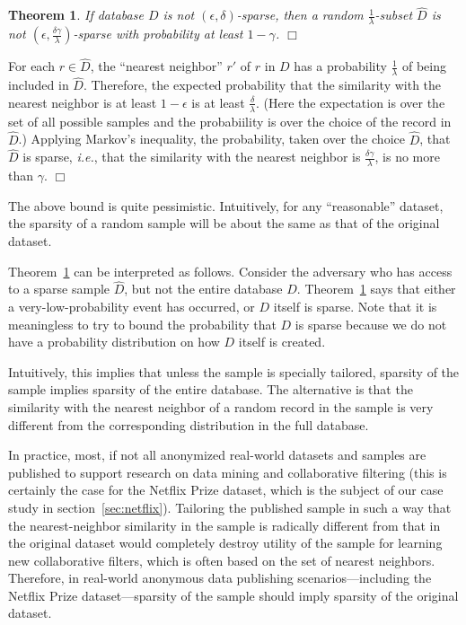 \documentclass[11pt]{article}
\newcommand{\ie}{\emph{i.e.}}
\newtheorem{theorem}{Theorem}
\newcommand{\qed}{\hfill \ensuremath{\Box}}
\begin{document}
\begin{theorem}
\label{samplesparsity}
If database $D$ is not $(\epsilon, \delta)$-sparse, then a random
$\frac{1}{\lambda}$-subset $\hat D$ is not $(\epsilon, \frac
{\delta\gamma}\lambda)$-sparse with probability at least $1-\gamma$. \qed
\end{theorem}

For each $r \in \hat D$, the ``nearest neighbor'' $r'$ of $r$ in $D$
has a probability $\frac 1 \lambda$ of being included in $\hat D$.
Therefore, the expected probability that the similarity with the nearest
neighbor is at least $1-\epsilon$ is at least $\frac \delta \lambda$.
(Here the expectation is over the set of all possible samples and the
probabiility is over the choice of the record in $\hat D$.)  Applying
Markov's inequality, the probability, taken over the choice $\hat D$, that
${\hat D}$ is sparse, \ie, that the similarity with the nearest neighbor
is $\frac{\delta\gamma}{\lambda}$, is no more than $\gamma$.  \qed

The above bound is quite pessimistic.  Intuitively, for any ``reasonable''
dataset, the sparsity of a random sample will be about the same as that
of the original dataset.

Theorem~\ref{samplesparsity} can be interpreted as follows.  Consider
the adversary who has access to a sparse sample $\hat D$, but not the
entire database $D$.  Theorem~\ref{samplesparsity} says that either
a very-low-probability event has occurred, or $D$ itself is sparse.
Note that it is meaningless to try to bound the probability that $D$
is sparse because we do not have a probability distribution on how $D$
itself is created.

Intuitively, this implies that unless the sample is specially tailored,
sparsity of the sample implies sparsity of the entire database.
The alternative is that the similarity with the nearest neighbor of a
random record in the sample is very different from the corresponding
distribution in the full database.

In practice, most, if not all anonymized real-world datasets and samples
are published to support research on data mining and collaborative
filtering (this is certainly the case for the Netflix Prize dataset,
which is the subject of our case study in section~\ref{sec:netflix}).
Tailoring the published sample in such a way that the nearest-neighbor
similarity in the sample is radically different from that in the
original dataset would completely destroy utility of the sample for
learning new collaborative filters, which is often based on the set of
nearest neighbors.  Therefore, in real-world anonymous data publishing
scenarios---including the Netflix Prize dataset---sparsity of the sample
should imply sparsity of the original dataset.
\end{document}
